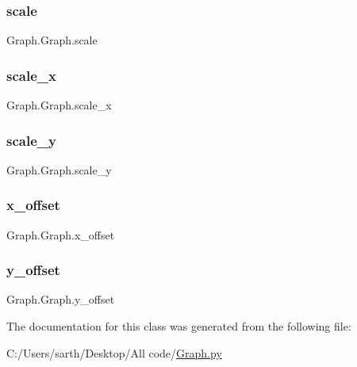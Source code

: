 \hypertarget{class_graph_1_1_graph_a8f6efbd0a24558179bc5de2f1c5c8915}{}\label{class_graph_1_1_graph_a8f6efbd0a24558179bc5de2f1c5c8915} 
\subsubsection{\texorpdfstring{scale}{scale}}
{\footnotesize\ttfamily Graph.\+Graph.\+scale}

\hypertarget{class_graph_1_1_graph_a39b2fad1286b410b3a79cf3a46cd4025}{}\label{class_graph_1_1_graph_a39b2fad1286b410b3a79cf3a46cd4025} 
\subsubsection{\texorpdfstring{scale\+\_\+x}{scale\_x}}
{\footnotesize\ttfamily Graph.\+Graph.\+scale\+\_\+x}

\hypertarget{class_graph_1_1_graph_ab146d2a4d40f06f6f6a3898d9f86698e}{}\label{class_graph_1_1_graph_ab146d2a4d40f06f6f6a3898d9f86698e} 
\subsubsection{\texorpdfstring{scale\+\_\+y}{scale\_y}}
{\footnotesize\ttfamily Graph.\+Graph.\+scale\+\_\+y}

\hypertarget{class_graph_1_1_graph_a037f73f95af8e580f546257afff16321}{}\label{class_graph_1_1_graph_a037f73f95af8e580f546257afff16321} 
\subsubsection{\texorpdfstring{x\+\_\+offset}{x\_offset}}
{\footnotesize\ttfamily Graph.\+Graph.\+x\+\_\+offset}

\hypertarget{class_graph_1_1_graph_a72faf5fc9b08ce6745dac6969624a8a6}{}\label{class_graph_1_1_graph_a72faf5fc9b08ce6745dac6969624a8a6} 
\subsubsection{\texorpdfstring{y\+\_\+offset}{y\_offset}}
{\footnotesize\ttfamily Graph.\+Graph.\+y\+\_\+offset}



The documentation for this class was generated from the following file\+:\begin{DoxyCompactItemize}
\item 
C\+:/\+Users/sarth/\+Desktop/\+All code/\hyperlink{_graph_8py}{Graph.\+py}\end{DoxyCompactItemize}
